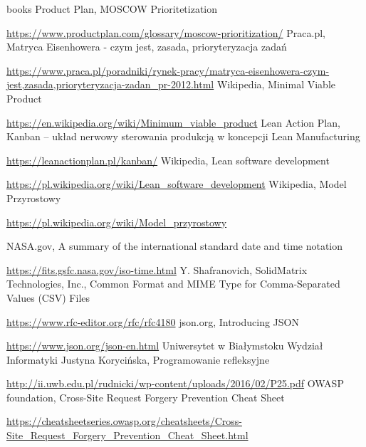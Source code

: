 \documentclass[a4paper,10pt, twoside]{report}
\begin{document}
\begin{large}
\begin{thebibliography} {books}
     Product Plan, MOSCOW Prioritetization \raggedright\url{
        https://www.productplan.com/glossary/moscow-prioritization/}
    Praca.pl, Matryca Eisenhowera - czym jest, zasada, prioryteryzacja zadań \raggedright\url{
        https://www.praca.pl/poradniki/rynek-pracy/matryca-eisenhowera-czym-jest,zasada,prioryteryzacja-zadan_pr-2012.html}
     Wikipedia, Minimal Viable Product \raggedright\url{
        https://en.wikipedia.org/wiki/Minimum_viable_product}
     Lean Action Plan, Kanban – układ nerwowy sterowania produkcją w koncepcji Lean Manufacturing \raggedright\url{
        https://leanactionplan.pl/kanban/}
     Wikipedia, Lean software development \raggedright\url{
        https://pl.wikipedia.org/wiki/Lean_software_development}
     Wikipedia, Model Przyrostowy \raggedright\url{
        https://pl.wikipedia.org/wiki/Model_przyrostowy}
    
     NASA.gov, A summary of the international standard date and time notation \raggedright\url{
        https://fits.gsfc.nasa.gov/iso-time.html}
     Y. Shafranovich, SolidMatrix Technologies, Inc., Common Format and MIME Type for Comma-Separated Values (CSV) Files \raggedright\url{
        https://www.rfc-editor.org/rfc/rfc4180}
     json.org, Introducing JSON \raggedright\url{
        https://www.json.org/json-en.html}
     Uniwersytet w Białymstoku Wydział Informatyki Justyna Korycińska, Programowanie refleksyjne \raggedright\url{
        http://ii.uwb.edu.pl/rudnicki/wp-content/uploads/2016/02/P25.pdf}
     OWASP foundation, Cross-Site Request Forgery Prevention Cheat Sheet \raggedright\url{
        https://cheatsheetseries.owasp.org/cheatsheets/Cross-Site_Request_Forgery_Prevention_Cheat_Sheet.html}
        

\end{thebibliography}
\end{large}
\end{document}
